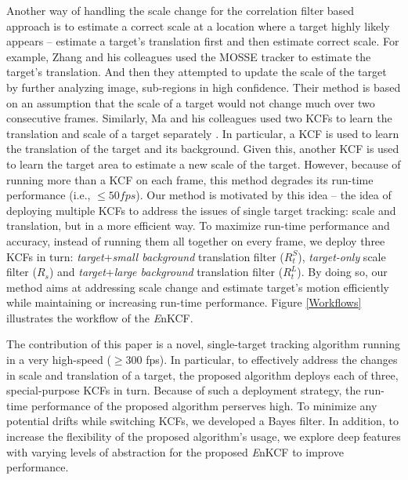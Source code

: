 \documentclass[10pt,twocolumn,letterpaper]{article}
\begin{document}
Another way of handling the scale change for the correlation filter
based approach is to estimate a correct scale at a location where a
target highly likely appears \cite{zhang2014fast} -- estimate a
target's translation first and then estimate correct scale. For
example, Zhang and his colleagues used the MOSSE tracker
\cite{bolme2010visual} to estimate the target's translation. And then
they attempted to update the scale of the target by further analyzing
image, sub-regions in high confidence. Their method is based on an
assumption that the scale of a target would not change much over two
consecutive frames. Similarly, Ma and his colleagues used two KCFs to
learn the translation and scale of a target separately
\cite{ma2015long}. In particular, a KCF is used to learn the
translation of the target and its background. Given this, another KCF
is used to learn the target area to estimate a new scale of the
target. However, because of running more than a KCF on each frame,
this method degrades its run-time performance (i.e., $\leq 50
fps$). Our method is motivated by this idea -- the idea of deploying
multiple KCFs to address the issues of single target tracking: scale
and translation, but in a more efficient way. To maximize run-time
performance and accuracy, instead of running them all together on
every frame, we deploy three KCFs in turn:
\textit{target}+\textit{small background} translation filter
($R_{t}^{S}$), \textit{target-only} scale filter ($R_{s}$) and
\textit{target}+\textit{large background} translation filter
($R_{t}^{L}$). By doing so, our method aims at addressing scale
change and estimate target's motion efficiently while maintaining or
increasing run-time performance. Figure \ref{Workflows} illustrates
the workflow of the {\it E}nKCF.

The contribution of this paper is a novel, single-target tracking
algorithm running in a very high-speed ($\geq300$ fps). In particular,
to effectively address the changes in scale and translation of a
target, the proposed algorithm deploys each of three, special-purpose
KCFs in turn. Because of such a deployment strategy, the run-time
performance of the proposed algorithm perserves high. To minimize any
potential drifts while switching KCFs, we developed a Bayes filter. In
addition, to increase the flexibility of the proposed algorithm's
usage, we explore deep features with varying levels of abstraction for
the proposed {\it E}nKCF to improve performance.

\end{document}
